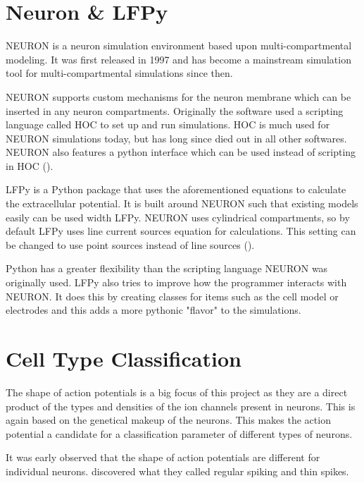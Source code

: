 \documentclass[altfont, fleqn]{uiophd}
\begin{document}
\section{Neuron \& LFPy }
NEURON is a neuron simulation environment 
based upon multi-compartmental modeling. 
It was first released in 1997 and
has become a mainstream simulation tool 
for multi-compartmental simulations since then. 

NEURON supports custom mechanisms for the neuron membrane
which can be inserted in any neuron compartments. 
Originally the software used a scripting language called HOC to
set up and run simulations. 
HOC is much used for NEURON simulations today, but
has long since died out in all
other softwares.
NEURON also features a python interface which can be used instead of
scripting in HOC
(\textcite{_documentation_????}).

LFPy is a Python package that uses the aforementioned equations
to calculate the extracellular potential. 
It is built around NEURON such that existing models easily 
can be used width LFPy. 
NEURON uses cylindrical compartments, so by default
LFPy uses line current sources equation for calculations. 
This setting can be changed to use point sources instead of line sources
(\textcite{linden_lfpy:_2013}).

Python has a greater flexibility than the scripting language
NEURON was originally used. 
LFPy also tries to improve how the programmer interacts with NEURON. 
It does this by creating classes for items such as 
the cell model or electrodes and this adds a more pythonic
"flavor" to the simulations. 


\section{Cell Type Classification}

The shape of action potentials is a big focus of this project
as they are a direct product of the types and densities of the ion channels
present in neurons. 
This is again based on the genetical makeup of the neurons. 
This makes the action potential a candidate for a classification parameter
of different types of neurons. 

It was early observed that the shape of action potentials are different for 
individual neurons. \textcite{mountcastle_cortical_1969} discovered what
they called regular spiking and thin spikes.
\end{document}
